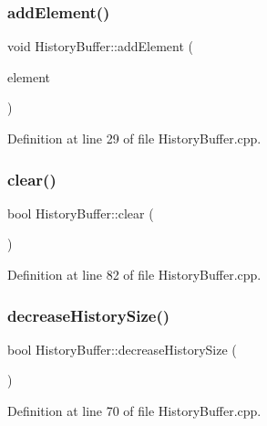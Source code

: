 \subsubsection{\texorpdfstring{add\+Element()}{addElement()}}
{\footnotesize\ttfamily void History\+Buffer\+::add\+Element (\begin{DoxyParamCaption}\item[{const Eigen\+::\+Ref$<$ const Eigen\+::\+Vector\+Xf $>$ \&}]{element }\end{DoxyParamCaption})}



Definition at line 29 of file History\+Buffer.\+cpp.

\mbox{\label{classbfl_1_1HistoryBuffer_ad9d3d44d796dccc5adb22be9594618c8}} 
\subsubsection{\texorpdfstring{clear()}{clear()}}
{\footnotesize\ttfamily bool History\+Buffer\+::clear (\begin{DoxyParamCaption}{ }\end{DoxyParamCaption})}



Definition at line 82 of file History\+Buffer.\+cpp.

\mbox{\label{classbfl_1_1HistoryBuffer_a3113fb73683eb5001e7fef0c6d3806cb}} 
\subsubsection{\texorpdfstring{decrease\+History\+Size()}{decreaseHistorySize()}}
{\footnotesize\ttfamily bool History\+Buffer\+::decrease\+History\+Size (\begin{DoxyParamCaption}{ }\end{DoxyParamCaption})}



Definition at line 70 of file History\+Buffer.\+cpp.

\mbox{\label{classbfl_1_1HistoryBuffer_a1cd85c51261b387cdb2247a19d6624e0}} 
